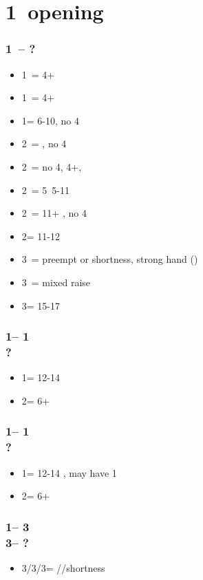\section{\texorpdfstring{1\diams\ opening}{1dOpening_easyVersion}}\label{sec:1dOpening_easyVersion}

\subsubsection*{1\diams\ -- ?}
\begin{itemize}
    \item 1\hearts\ = 4+\hearts
    \item 1\spades\ = 4+\spades
    \item 1\nt = 6-10, no 4\major
    \item 2\clubs\ = \gf, no 4\major
    \item 2\diams\ = no 4\major, 4+\diams, \invp
    \item 2\hearts\ = 5\hearts\ 5-11
    \item 2\spades\ = 11+ \bal, no 4\major
    \item 2\nt = 11-12 \bal
    \item 3\clubs\ = \diams preempt or shortness, strong hand (\diams)
    \item 3\diams\ = mixed raise
    \item 3\nt = 15-17 \bal
\end{itemize}

\subsubsection*{1\diams -- 1\hearts\\ ?}
\begin{itemize}
    \item 1\nt = 12-14 \bal
    \item 2\diams = 6+\diams
\end{itemize}

\subsubsection*{1\diams -- 1\spades\\ ?}
\begin{itemize}
    \item 1\nt = 12-14 \bal, may have 1\spades
    \item 2\diams = 6+\diams
\end{itemize}

\subsubsection*{1\diams -- 3\clubs\\
                3\diams -- ?}
\begin{itemize}
    \item 3\hearts/3\spades/3\nt = \hearts/\spades/\clubs shortness
\end{itemize}

